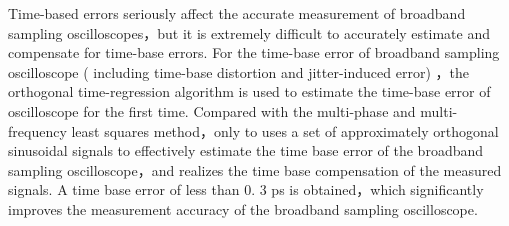 Time-based errors seriously affect the accurate measurement of broadband sampling oscilloscopes，but it is extremely difficult to accurately estimate and compensate for time-base errors. For the time-base error of broadband sampling oscilloscope ( including time-base distortion and jitter-induced error) ，the orthogonal time-regression algorithm is used to estimate the time-base error of oscilloscope for the first time. Compared with the multi-phase and multi-frequency least squares method，only to uses a set of approximately orthogonal sinusoidal signals to effectively estimate the time base error of the broadband sampling oscilloscope，and realizes the time base compensation of the measured signals. A time base error of less than 0. 3 ps is obtained，which significantly improves the measurement accuracy of the broadband sampling oscilloscope.